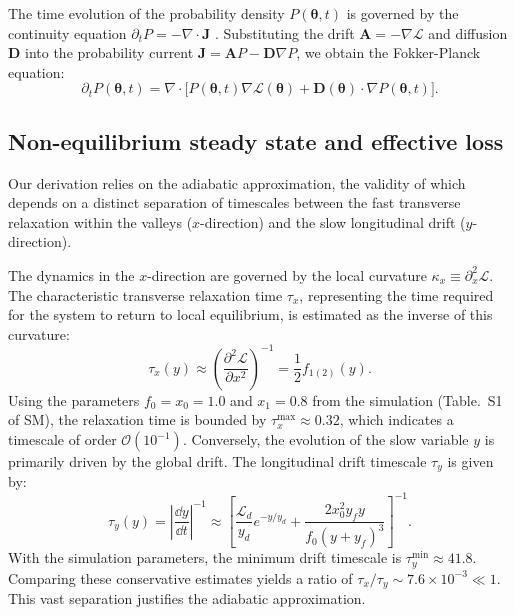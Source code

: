 \documentclass[aps,prx,reprint,superscriptaddress,longbibliography,nofootinbib,floatfix]{revtex4-2}
\begin{document}
The time evolution of the probability density $P(\bm{\theta}, t)$ is governed by the continuity equation $\partial_t P = -\nabla \cdot \mathbf{J}$ \cite{gardiner2009stochastic}. Substituting the drift $\mathbf{A} = -\nabla \mathcal{L}$ and diffusion $\mathbf{D}$ into the probability current $\mathbf{J} = \mathbf{A}P - \mathbf{D}\nabla P$, we obtain the Fokker-Planck equation:
\begin{equation}
    \partial_t P(\bm{\theta}, t) = \nabla \cdot \Big[ P(\bm{\theta}, t) \nabla \mathcal{L}(\bm{\theta}) 
    + \mathbf{D}(\bm{\theta}) \cdot \nabla P(\bm{\theta}, t) \Big].
    \label{eq:si_fp_final} 
\end{equation}

\subsection{Non-equilibrium steady state and effective loss} \label{sec:appendix2}

Our derivation relies on the adiabatic approximation, the validity of which depends on a distinct separation of timescales between the fast transverse relaxation within the valleys ($x$-direction) and the slow longitudinal drift ($y$-direction).

The dynamics in the $x$-direction are governed by the local curvature $\kappa_x \equiv \partial_x^2 \mathcal{L}$. The characteristic transverse relaxation time $\tau_x$, representing the time required for the system to return to local equilibrium, is estimated as the inverse of this curvature:
\begin{equation}
    \tau_x(y) \approx \left( \frac{\partial^2 \mathcal{L}}{\partial x^2} \right)^{-1} = \frac{1}{2} f_{1(2)}(y).
\end{equation}
Using the parameters $f_0=x_0=1.0$ and $x_1=0.8$ from the simulation (Table.~S1 of SM), the relaxation time is bounded by $\tau_x^{\mathrm{max}} \approx 0.32$, which indicates a timescale of order $\mathcal{O}(10^{-1})$. Conversely, the evolution of the slow variable $y$ is primarily driven by the global drift. The longitudinal drift timescale $\tau_y$ is given by:
\begin{equation}
    \tau_y(y) = \left| \frac{\dd y}{\dd t} \right|^{-1}\approx \left[ \frac{\mathcal{L}_d}{y_d} e^{-y/y_d} +\frac{2x_0^2 y_f y}{f_0(y+y_f)^3} \right]^{-1}.
\end{equation}
With the simulation parameters, the minimum drift timescale is $\tau_y^{\mathrm{min}} \approx 41.8$. Comparing these conservative estimates yields a ratio of $\tau_x / \tau_y \sim 7.6 \times 10^{-3} \ll 1$. This vast separation justifies the adiabatic approximation.
\end{document}
